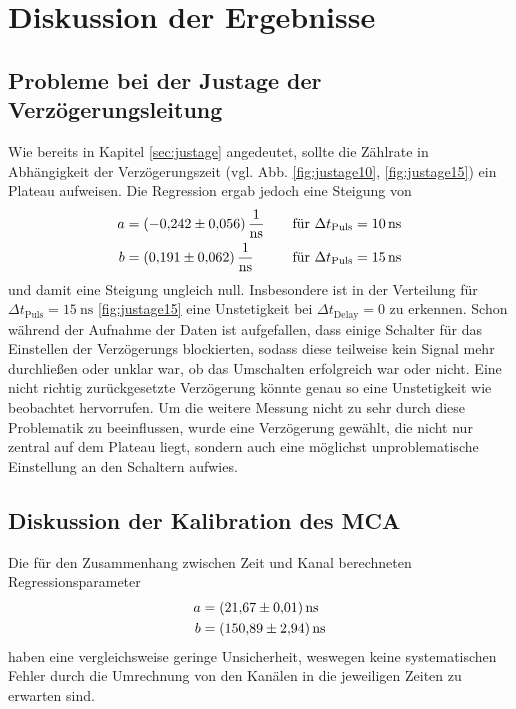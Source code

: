 \section{Diskussion der Ergebnisse}
\label{sec:Diskussion}

\subsection{Probleme bei der Justage der Verzögerungsleitung}
Wie bereits in Kapitel \ref{sec:justage} angedeutet, sollte die Zählrate in Abhängigkeit der Verzögerungszeit (vgl. Abb. \ref{fig:justage10}, \ref{fig:justage15})
ein Plateau aufweisen. Die Regression ergab jedoch eine Steigung von 
\begin{align*}
    a&=\SI{-0.242 \pm 0.056}{\per\nano\second} \quad &\text{für $\Delta t_{\text{Puls}}=\SI{10}{\nano\second}$}\\
    b&=\SI{0.191 \pm 0.062 }{\per\nano\second} \quad &\text{für $\Delta t_{\text{Puls}}=\SI{15}{\nano\second}$}
\end{align*}
und damit eine Steigung ungleich null. Insbesondere ist in der Verteilung für $\Delta t_{\text{Puls}}=\SI{15}{\nano\second}$ \ref{fig:justage15} eine 
Unstetigkeit bei $\Delta t_\text{Delay}=0$ zu erkennen. Schon während der Aufnahme der Daten ist aufgefallen, dass einige Schalter für das Einstellen der Verzögerungs
blockierten, sodass diese teilweise kein Signal mehr durchließen oder unklar war, ob das Umschalten erfolgreich war oder nicht. Eine nicht richtig zurückgesetzte Verzögerung könnte genau so eine Unstetigkeit wie beobachtet hervorrufen. Um die weitere Messung nicht zu sehr durch diese Problematik zu beeinflussen,
wurde eine Verzögerung gewählt, die nicht nur zentral auf dem Plateau liegt, sondern auch eine möglichst unproblematische Einstellung an den Schaltern aufwies.

\subsection{Diskussion der Kalibration des MCA}
Die für den Zusammenhang zwischen Zeit und Kanal berechneten Regressionsparameter 
\begin{align*}
    a &= \SI{21.67 \pm 0.01}{\nano\second} \\ 
    b &= \SI{150.89 \pm 2.94}{\nano\second}
 \end{align*}
haben eine vergleichsweise geringe Unsicherheit, weswegen keine systematischen Fehler durch die Umrechnung von den Kanälen in die jeweiligen Zeiten zu erwarten sind. 

